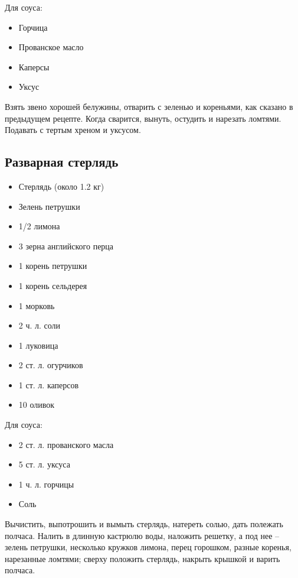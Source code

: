 Для соуса: 

\begin{itemize}
	\item Горчица
    \item Прованское масло 
    \item Каперсы 
    \item Уксус
\end{itemize}

Взять звено хорошей белужины, отварить с зеленью и кореньями, как сказано в предыдущем рецепте. Когда сварится, вынуть, остудить и нарезать ломтями. Подавать с тертым хреном и уксусом.

\subsection{Разварная стерлядь}

\begin{itemize}
	\item Стерлядь (около 1.2 кг)
    \item Зелень петрушки
    \item 1/2 лимона
    \item 3 зерна английского перца
    \item 1 корень петрушки
    \item 1 корень сельдерея
    \item 1 морковь
    \item 2 ч. л. соли
    \item 1 луковица
    \item 2 ст. л. огурчиков 
    \item 1 ст. л. каперсов
    \item 10 оливок
\end{itemize}

Для соуса: 

\begin{itemize}
	\item 2 ст. л. прованского масла 
    \item 5 ст. л. уксуса 
    \item 1 ч. л. горчицы 
    \item Соль
\end{itemize}

Вычистить, выпотрошить и вымыть стерлядь, натереть солью, дать полежать полчаса. Налить в длинную кастрюлю воды, наложить решетку, а под нее – зелень петрушки, несколько кружков лимона, перец горошком, разные коренья, нарезанные ломтями; сверху положить стерлядь, накрыть крышкой и варить полчаса.

